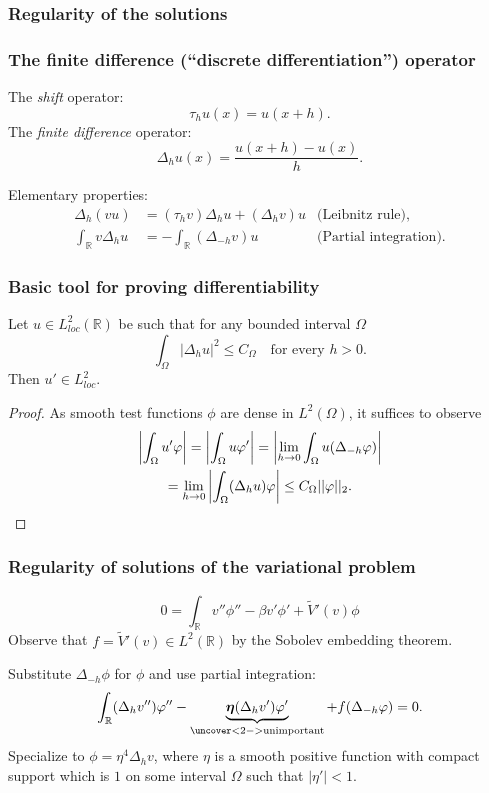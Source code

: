 \documentclass[9pt, english]{beamer}
\theoremstyle{definition}
\newcommand{\R}{\mathbb{R}}                     %
\begin{document}
\subsubsection{Regularity of the solutions}
\begin{frame}
\frametitle{The finite difference (``discrete differentiation'')
operator}
\begin{definition}
The \emph{shift} operator:
\[
\tau_h u(x) = u(x+h).
\]
The \emph{finite difference} operator:
\[
\Delta_h u(x) = \frac{u(x+h) - u(x)}{h}.
\]
\end{definition}
Elementary properties:
\begin{align*}
\Delta_h(v u) &= (\tau_h v) \Delta_h u + (\Delta_h v) u & \text{(Leibnitz rule),}\\
\int_\R v \Delta_h u &= - \int_\R (\Delta_{-h} v) u & \text{(Partial
integration)}.
\end{align*}
\end{frame}

\begin{frame}
\frametitle{Basic tool for proving differentiability}
\begin{lemma}
Let $u \in L^2_{loc}(\R)$ be such that for any bounded interval
$\Omega$
\[
\int_\Omega |\Delta_h u|^2 \leq C_\Omega \quad \text{for every }
h>0.
\]
Then $u' \in L^2_{loc}$.
\end{lemma}
\begin{proof}
As smooth test functions $\phi$ are dense in $L^2(\Omega)$, it
suffices to observe
\begin{multline*}
\left| \int_\Omega u' \phi \right| = \left| \int_\Omega u \phi'
\right| = \left| \lim_{h \to 0} \int_\Omega u (\Delta_{-h} \phi)
\right|
\\=
\lim_{h \to 0} \left| \int_\Omega (\Delta_{h} u) \phi \right| \leq
C_\Omega ||\phi||_2. \qedhere
\end{multline*}
\end{proof}
\end{frame}

\begin{frame}
\frametitle{Regularity of solutions of the variational problem}
\[
0 = \int_\R v'' \phi'' - \beta v' \phi' + \tilde V'(v) \phi
\]
Observe that $f = \tilde V'(v) \in L^2(\R)$ by the Sobolev embedding
theorem.

Substitute $\Delta_{-h} \phi$ for $\phi$ and use partial
integration:
\[
\int_\R (\Delta_h v'') \phi'' - \underbrace{\beta (\Delta_h v')
\phi'}_{\uncover<2->{\text{unimportant}}} + f (\Delta_{-h} \phi) =
0.
\]
\pause Specialize to $\phi = \eta^4 \Delta_h v$, where $\eta$ is a
smooth positive function with compact support which is $1$ on some
interval $\Omega$ such that $|\eta'| < 1$.
\end{frame}
\end{document}
